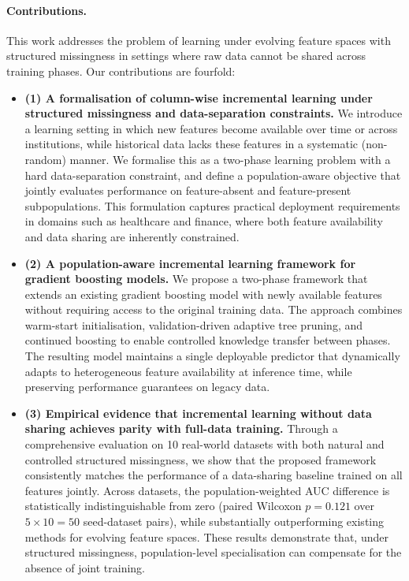 \documentclass[sigconf]{acmart}
\begin{document}
\paragraph{Contributions.}
This work addresses the problem of learning under evolving feature spaces with structured missingness in settings where raw data cannot be shared across training phases. Our contributions are fourfold:
\begin{itemize}
\setlength\itemindent{0pt}
\setlength{\itemindent}{0pt}
\item \textbf{(1) A formalisation of column-wise incremental learning under structured missingness and data-separation constraints.}
We introduce a learning setting in which new features become available over time or across institutions, while historical data lacks these features in a systematic (non-random) manner. We formalise this as a two-phase learning problem with a hard data-separation constraint, and define a population-aware objective that jointly evaluates performance on feature-absent and feature-present subpopulations. This formulation captures practical deployment requirements in domains such as healthcare and finance, where both feature availability and data sharing are inherently constrained.

\item \textbf{(2) A population-aware incremental learning framework for gradient boosting models.}
We propose a two-phase framework that extends an existing gradient boosting model with newly available features without requiring access to the original training data. The approach combines warm-start initialisation, validation-driven adaptive tree pruning, and continued boosting to enable controlled knowledge transfer between phases. The resulting model maintains a single deployable predictor that dynamically adapts to heterogeneous feature availability at inference time, while preserving performance guarantees on legacy data.

\item \textbf{(3) Empirical evidence that incremental learning without data sharing achieves parity with full-data training.}
Through a comprehensive evaluation on 10 real-world datasets with both natural and controlled structured missingness, we show that the proposed framework consistently matches the performance of a data-sharing baseline trained on all features jointly. Across datasets, the population-weighted AUC difference is statistically indistinguishable from zero (paired Wilcoxon $p = 0.121$ over $5\times 10 = 50$ seed-dataset pairs), while substantially outperforming existing methods for evolving feature spaces. These results demonstrate that, under structured missingness, population-level specialisation can compensate for the absence of joint training.


\end{itemize}
\end{document}
